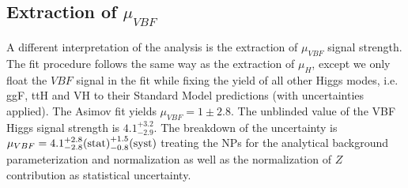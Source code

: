 %


\subsection{Extraction of $\mu_{VBF}$}
\label{sec:vbf-higgsunblindvbf}
A different interpretation of the analysis is the extraction of $\mu_{VBF}$ signal strength.
The fit procedure follows the same way as the extraction of $\mu_{H}$, except we only float
the $VBF$ signal in the fit while fixing the yield of all other Higgs modes, i.e. ggF,
ttH and VH to their Standard Model predictions (with uncertainties applied).
The Asimov fit yields $\mu_{VBF}=1\pm 2.8$. The unblinded value of the VBF Higgs signal
strength is $4.1^{+3.2}_{-2.9}$. The breakdown of the uncertainty
is $\mu_{VBF}=4.1^{+2.8}_{-2.8}\textnormal{(stat)}^{+1.5}_{-0.8}\textnormal{(syst)}$ treating
the NPs for the analytical background parameterization and normalization as well as
the normalization of $Z$ contribution as statistical uncertainty.



